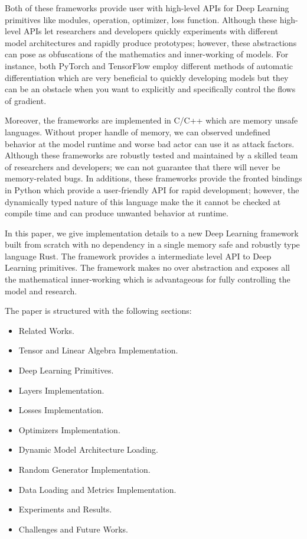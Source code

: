 \documentclass[conference]{IEEEtran}
\begin{document}
Both of these frameworks provide user with high-level APIs for Deep Learning primitives like modules, operation, optimizer, loss function. 
Although these high-level APIs let researchers and developers quickly experiments with different model architectures and rapidly produce prototypes; however, these abstractions can pose as obfuscations of the mathematics and inner-working of models.
For instance, both PyTorch and TensorFlow employ different methods of automatic differentiation which are very beneficial to quickly developing models but they can be an obstacle when you want to explicitly and specifically control the flows of gradient.

Moreover, the frameworks are implemented in C/C++ which are memory unsafe languages.
Without proper handle of memory, we can observed undefined behavior at the model runtime and worse bad actor can use it as attack factors.
Although these frameworks are robustly tested and maintained by a skilled team of researchers and developers; we can not guarantee that there will never be memory-related bugs.
In additions, these frameworks provide the fronted bindings in Python which provide a user-friendly API for rapid development; however, the dynamically typed nature of this language make the it cannot be checked at compile time and can produce unwanted behavior at runtime.

In this paper, we give implementation details to a new Deep Learning framework built from scratch with no dependency in a single memory safe and robustly type language Rust. The framework provides a intermediate level API to Deep Learning primitives. The framework makes no over abstraction and exposes all the mathematical inner-working which is advantageous for fully controlling the model and research.

The paper is structured with the following sections:
\begin{itemize}
    \item Related Works.
    \item Tensor and Linear Algebra Implementation.
    \item Deep Learning Primitives.
    \item Layers Implementation.
    \item Losses Implementation.
    \item Optimizers Implementation.
    \item Dynamic Model Architecture Loading.
    \item Random Generator Implementation.
    \item Data Loading and Metrics Implementation.
    \item Experiments and Results.
    \item Challenges and Future Works.
\end{itemize}
\end{document}
